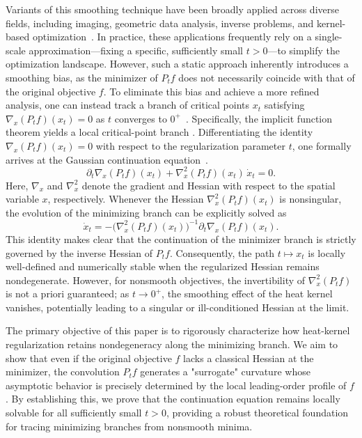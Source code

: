 \documentclass{article}
\begin{document}
Variants of this smoothing technique have been broadly applied across diverse fields, including imaging, geometric data analysis, inverse problems, and kernel-based optimization~\cite{seo2010heat, lindeberg2013scale, yang2014mollification, nesterov2017random, chung2019heat}. In practice, these applications frequently rely on a single-scale approximation—fixing a specific, sufficiently small $t > 0$—to simplify the optimization landscape. However, such a static approach inherently introduces a smoothing bias, as the minimizer of $P_t f$ does not necessarily coincide with that of the original objective $f$. To eliminate this bias and achieve a more refined analysis, one can instead track a branch of critical points $x_t$ satisfying $\nabla_x(P_t f)(x_t) = 0$ as $t$ converges to $0^+$~\cite{iwakiri2022single, starnes2023gaussian, xu2025global}. Specifically, the implicit function theorem yields a local critical-point branch \cite{allgower1993continuation,hao2022adaptive,seguin2022continuation}. Differentiating the identity $\nabla_x(P_t f)(x_t)=0$ with respect to the regularization parameter $t$, one formally arrives at the Gaussian continuation equation~\cite{mobahi2015theoretical,ilersich2025deep,gu2026deep}.
\begin{equation}\label{eq:continuation-raw}
\partial_t \nabla_x(P_t f)(x_t)+\nabla_x^2(P_t f)(x_t)\,\dot x_t=0.
\end{equation}
Here, $\nabla_x$ and $\nabla_x^2$ denote the gradient and Hessian with respect to the spatial variable $x$, respectively. Whenever the Hessian $\nabla_x^2(P_t f)(x_t)$ is nonsingular, the evolution of the minimizing branch can be explicitly solved as
\begin{equation}\label{eq:continuation-inverse}
\dot x_t = -\bigl(\nabla_x^2(P_t f)(x_t)\bigr)^{-1}\partial_t \nabla_x(P_t f)(x_t).
\end{equation}
This identity makes clear that the continuation of the minimizer branch is strictly governed by the inverse Hessian of $P_t f$. Consequently, the path $t \mapsto x_t$ is locally well-defined and numerically stable when the regularized Hessian remains nondegenerate. However, for nonsmooth objectives, the invertibility of $\nabla_x^2(P_t f)$ is not a priori guaranteed; as $t \to 0^+$, the smoothing effect of the heat kernel vanishes, potentially leading to a singular or ill-conditioned Hessian at the limit.

The primary objective of this paper is to rigorously characterize how heat-kernel regularization retains nondegeneracy along the minimizing branch. We aim to show that even if the original objective $f$ lacks a classical Hessian at the minimizer, the convolution $P_t f$ generates a "surrogate" curvature whose asymptotic behavior is precisely determined by the local leading-order profile of $f$. By establishing this, we prove that the continuation equation remains locally solvable for all sufficiently small $t > 0$, providing a robust theoretical foundation for tracing minimizing branches from nonsmooth minima.
\end{document}
